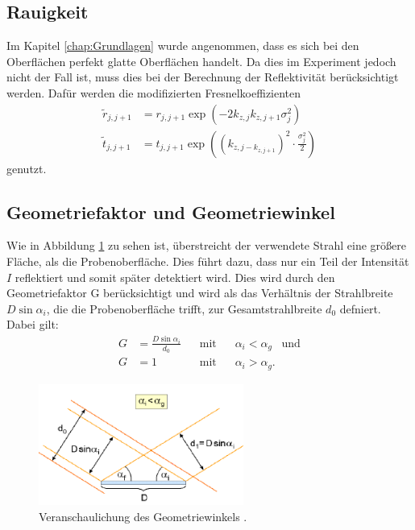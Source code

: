 \subsection{Rauigkeit}
Im Kapitel \ref{chap:Grundlagen} wurde angenommen, dass es sich bei den Oberflächen perfekt glatte Oberflächen handelt. Da dies im Experiment jedoch nicht der Fall ist, muss dies bei der Berechnung der Reflektivität berücksichtigt werden. 
Dafür werden die modifizierten Fresnelkoeffizienten
\begin{align}
    \tilde{r}_{j,j+1}&=r_{j,j+1}\exp(-2k_{z,j}k_{z,j+1}\sigma^2_j)\\
    \tilde{t}_{j,j+1}&=t_{j,j+1}\exp((k_{z,j-k_{z,j+1}})^2 \cdot \frac{\sigma^2_j}{2})
\end{align} 
genutzt. %

\subsection{Geometriefaktor und Geometriewinkel}
Wie in Abbildung \ref{fig:geo} zu sehen ist, überstreicht der verwendete Strahl eine größere Fläche, als die Probenoberfläche. Dies führt dazu, dass nur ein Teil der Intensität $I$ reflektiert und somit später detektiert wird. 
Dies wird durch den Geometriefaktor G berücksichtigt und wird als das Verhältnis der Strahlbreite
$D \sin{\alpha_i} $, die die Probenoberfläche trifft, zur Gesamtstrahlbreite $d_0$ defniert.
Dabei gilt:
\begin{align}
    G&=\frac{D\sin\alpha_i}{d_0}\;\;\; &\text{mit}\;\;\; &\alpha_i<\alpha_g\;\;\; \text{und}\\
    G&=1\;\;\; &\text{mit}\;\;\; &\alpha_i>\alpha_g.
\end{align}

\begin{figure}
    \centering
    \includegraphics[width=0.6\textwidth]{content/images/Geometriewinkel.png}
    \caption{Veranschaulichung des Geometriewinkels \cite{anleitung}.}
    \label{fig:geo}
  \end{figure}